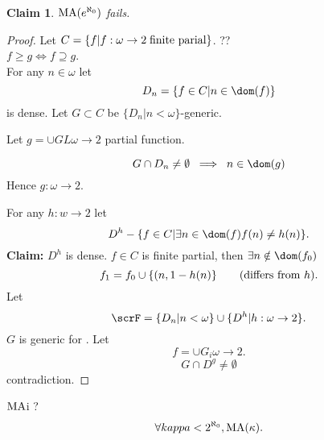 \documentclass[11pt,pdftex,twoside,a4paper]{article}
\newcommand{\B}[1]{\textbf{#1}}
\newcommand{\MA}{\mathop{\rm MA}\nolimits}
\newtheorem{claim}[thm]{Claim}
\begin{document}
\begin{claim}
\(\MA(e^{\aleph_0})\) fails.
\end{claim}
\begin{proof}
Let \(C = \{f| f: \omega \to 2 \;\textnormal{finite parial}\}\). ??
\\
\(f \geq g \iff f \supseteq g\).
\\
For any \(n\in \omega\) let
\begin{equation*}
D_n = \{f\in C| n \in\dom(f)\}
\end{equation*}
is dense.
Let \(G \subset C\)  be  \(\{D_n|n < \omega\}\)-generic.

Let \(g = \cup GL \omega \to 2\) partial function.

\begin{equation*}
 G \cap D_n \neq \emptyset \;\implies\; n \in \dom(g)
\end{equation*}
Hence  \(g:\omega \to 2\).

For any \(h:w\to 2\) let
\begin{equation*}
D^h - \{f\in C| \exists n\in \dom(f) f(n)\neq h(n)\}.
\end{equation*}
\B{Claim:} \(D^h\) is dense.
\(f\in C\) is finite partial, then \(\exists n \notin \dom(f_0)\)
\begin{equation*}
f_1 = f_0 \cup \{(n,1 - h(n)\} \qquad \textnormal{(differs from $h$)}.
\end{equation*}
Let
\begin{equation*}
\scrF = \{D_n | n < \omega\} \cup \{D^h | h : \omega \to 2\}.
\end{equation*}
$G$ is generic for \scrF.
Let
\begin{equation*}
f = \cup G_i \omega \to 2.
\end{equation*}
\begin{equation*}
 G \cap D^g \neq \emptyset
\end{equation*}
contradiction.
\end{proof}

\(\MA\)i ?
\begin{equation*}
\forall \\kappa < 2^{\aleph_0}, \MA(\kappa).
\end{equation*}

\end{document}
